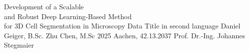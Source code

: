 \documentclass[12pt,a4paper,titlepage,twoside,numbers=noenddot,BCOR=12mm]{scrreprt}
\begin{document}

\pagestyle{scrheadings}
\renewcommand{\chaptermark}[1]{\markboth{#1}{#1}}
\renewcommand{\sectionmark}[1]{\markright{\thesection\ \ #1}}

%
%

\addtolength{\topmargin}{0.5cm}
\addtolength{\textwidth}{5cm}
\pagestyle{empty}
             {Development of a Scalable\\		
			and Robust Deep Learning-Based Method		\\	  			
			for 3D Cell Segmentation in Microscopy Data	}     %
             {Title in second language}      %
             {Daniel Geiger, B.Sc.}                     %
             {Zhu Chen, M.Sc}          %
             {2025}                                  %
             {Aachen, 42.13.2037} 	%
             {Prof. Dr.-Ing. Johannes Stegmaier} %

\addtolength{\textwidth}{-5cm}
\cleardoublepage


%
%

\pagestyle{plain}
\tableofcontents
\cleardoublepage


\pagestyle{empty}
\begingroup
\let\cleardoublepage\relax
\let\clearpage\relax
{}
\listoffigures
{}
\listoftables
{}
\listoflistings
\endgroup
\cleardoublepage

\pagestyle{empty}

\cleardoublepage 
\end{document}
